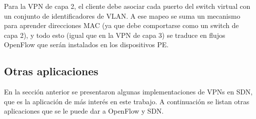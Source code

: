 Para la VPN de capa 2, el cliente debe asociar cada puerto del switch virtual con un conjunto de identificadores de VLAN. A ese mapeo se suma un mecanismo para aprender direcciones MAC (ya que debe comportarse como un switch de capa 2), y todo esto (igual que en la VPN de capa 3) se traduce en flujos OpenFlow que serán instalados en los dispositivos PE.

\subsection{Otras aplicaciones}
En la sección anterior se presentaron algunas implementaciones de VPNs en SDN, que es la aplicación de más interés en este trabajo. A continuación se listan otras aplicaciones que se le puede dar a OpenFlow y SDN.
